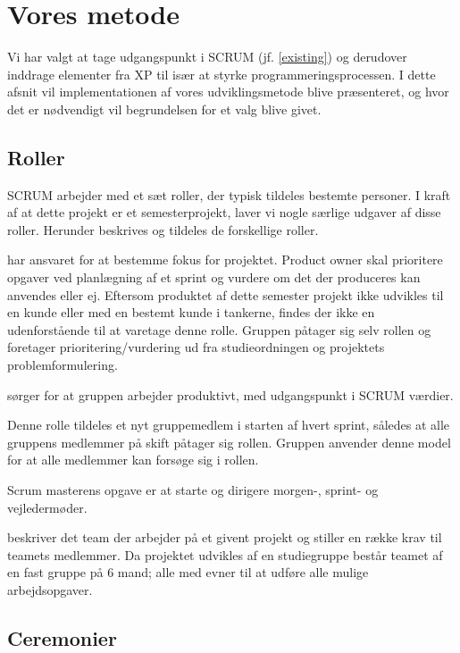 { %

\newcommand{\XPhere}{\marginpar{\textbf{\footnotesize XP}}}

\section{Vores metode}\label{ourmethod}
Vi har valgt at tage udgangspunkt i SCRUM (jf. \cref{existing}) og derudover inddrage elementer fra XP til især at styrke programmeringsprocessen.
I dette afsnit vil implementationen af vores udviklingsmetode blive præsenteret, og hvor det er nødvendigt vil begrundelsen for et valg blive givet.

\subsection{Roller}
SCRUM arbejder med et sæt roller, der typisk tildeles bestemte personer.
I kraft af at dette projekt er et semesterprojekt, laver vi nogle særlige udgaver af disse roller.
Herunder beskrives og tildeles de forskellige roller.
\begin{description}
{har ansvaret for at bestemme fokus for projektet.
Product owner skal prioritere opgaver ved planlægning af et sprint og vurdere om det der produceres kan anvendes eller ej.}
{Eftersom produktet af dette semester projekt ikke udvikles til en kunde eller med en bestemt kunde i tankerne, findes der ikke en udenforstående til at varetage denne rolle.
Gruppen påtager sig selv rollen og foretager prioritering/vurdering ud fra studieordningen og projektets problemformulering.}

{sørger for at gruppen arbejder produktivt, med udgangspunkt i SCRUM værdier.}
{Denne rolle tildeles et nyt gruppemedlem i starten af hvert sprint, således at alle gruppens medlemmer på skift påtager sig rollen.
Gruppen anvender denne model for at alle medlemmer kan forsøge sig i rollen.


Scrum masterens opgave er at starte og dirigere morgen-, sprint- og vejledermøder.}

{beskriver det team der arbejder på et givent projekt og stiller en række krav til teamets medlemmer.}
{Da projektet udvikles af en studiegruppe består teamet af en fast gruppe på 6 mand; alle med evner til at udføre alle mulige arbejdsopgaver.}
\end{description}

\subsection{Ceremonier}\label{workshop1:ceremonies}

}
